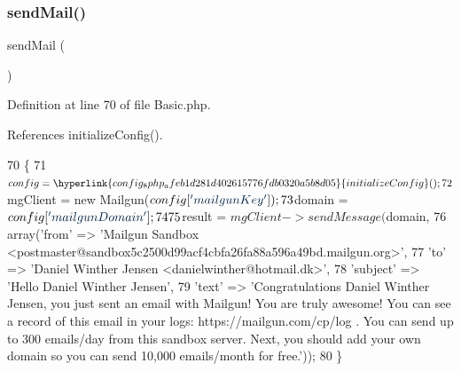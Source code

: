 \hypertarget{class_basic_a1f753d67be418d065282360fc5231d05}{}\label{class_basic_a1f753d67be418d065282360fc5231d05} 
\subsubsection{\texorpdfstring{send\+Mail()}{sendMail()}}
{\footnotesize\ttfamily send\+Mail (\begin{DoxyParamCaption}{ }\end{DoxyParamCaption})}



Definition at line 70 of file Basic.\+php.



References initialize\+Config().


\begin{DoxyCode}
70                                \{
71         $config = \hyperlink{config_8php_afeb1d281d402615776fdb0320a5b8d05}{initializeConfig}();
72         $mgClient = \textcolor{keyword}{new} Mailgun($config[\textcolor{stringliteral}{'mailgunKey'}]);
73         $domain = $config[\textcolor{stringliteral}{'mailgunDomain'}];
74 
75         $result = $mgClient->sendMessage($domain,
76             array(\textcolor{stringliteral}{'from'}    => \textcolor{stringliteral}{'Mailgun Sandbox
       <postmaster@sandbox5c2500d99acf4cbfa26fa88a596a49bd.mailgun.org>'},
77                 \textcolor{stringliteral}{'to'}      => \textcolor{stringliteral}{'Daniel Winther Jensen <danielwinther@hotmail.dk>'},
78                 \textcolor{stringliteral}{'subject'} => \textcolor{stringliteral}{'Hello Daniel Winther Jensen'},
79                 \textcolor{stringliteral}{'text'}    => \textcolor{stringliteral}{'Congratulations Daniel Winther Jensen, you just sent an email with Mailgun! 
       You are truly awesome!  You can see a record of this email in your logs: https://mailgun.com/cp/log .  You
       can send up to 300 emails/day from this sandbox server.  Next, you should add your own domain so you can send
       10,000 emails/month for free.'}));
80     \}
\end{DoxyCode}
\hypertarget{class_basic_a624b6482127c1e3ea78392e7e93db949}{}\label{class_basic_a624b6482127c1e3ea78392e7e93db949} 
